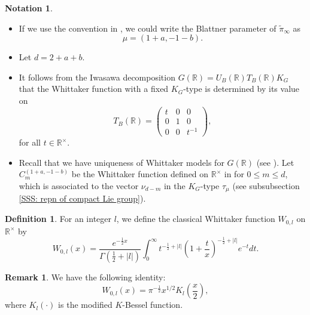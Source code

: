 \documentclass[11pt, a4paper]{amsart}
\theoremstyle{plain}
\theoremstyle{definition}
\newtheorem{definition}[theorem]{Definition}
\newtheorem{remark}[theorem]{Remark}
\newtheorem{notation}[theorem]{Notation}
\numberwithin{equation}{section}
\def\RR{\mathbb{R}}
\begin{document}
\begin{notation}
    \begin{itemize}
        \item If we use the convention in \cite[page 965]{Koseki-Oda95}, we could write the Blattner parameter of $\tilde{\pi}_{\infty}$ as 
             \begin{equation*}
                 \mu = (1 + a, -1 - b). 
             \end{equation*}
        \item Let $d = 2 + a + b$. 
        \item It follows from the Iwasawa decomposition $G(\RR) = U_{B}(\RR)T_{B}(\RR) K_{G}$ that the Whittaker function with a fixed $K_{G}$-type is determined by its value on 
        \begin{equation*}
           T_{B}(\RR) =  \begin{pmatrix}
                            t & 0 & 0 \\
                            0 & 1 & 0 \\
                            0 & 0 & t^{-1}
                        \end{pmatrix}, 
        \end{equation*}
        for all $t \in \RR^{\times}$. 
        \item Recall that we have uniqueness of Whittaker models for $G(\RR)$ (see \cite[\S 3.2]{Koseki-Oda95}). Let $C_{m}^{(1+a, -1-b)}$ be the Whittaker function defined  on $\RR^{\times}$ in \textnormal{\cite[P974]{Koseki-Oda95}} for $0 \le m \le d$, which is associated to the vector $\nu_{d - m}$ in the $K_{G}$-type $\tau_{\mu}$ (see subsubsection \ref{SSS: repn of compact Lie group}). 
    \end{itemize}
\end{notation}

\begin{definition}
\label{Def: classical Whittaker function}
    For an integer $l$, we define the classical Whittaker function $W_{0, l}$ on $\RR^{\times}$ by 
             \begin{equation}
             \label{def:Whittaker_function}
                 W_{0, l}(x) = \frac{e^{-\frac{1}{2}x}}{\Gamma(\frac{1}{2} + |l|)} \int_{0}^{\infty} t^{-\frac{1}{2} + |l|}(1 + \frac{t}{x})^{-\frac{1}{2} + |l|} e^{-t} dt. 
             \end{equation}
\end{definition}

\begin{remark}
    We have the following identity: 
    \begin{equation*}
        W_{0, l}(x) = \pi^{-\frac{1}{2}} x^{1/2} K_{l}(\frac{x}{2}), 
    \end{equation*}
    where $K_{l}(\cdot)$ is the modified $K$-Bessel function. 
\end{remark}
\end{document}
